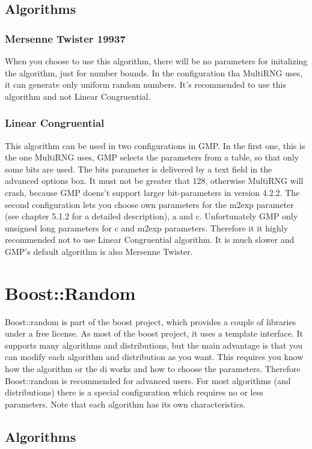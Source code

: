 \documentclass{scrartcl}
\begin{document}
\subsection{Algorithms}
\subsubsection{Mersenne Twister 19937}
When you choose to use this algorithm, there will be no parameters for initalizing the algorithm, just for number bounds. In the configuration tha MultiRNG uses, it can generate only uniform random numbers. It's recommended to use this algorithm and not Linear Congruential.
\subsubsection{Linear Congruential}
This algorithm can be used in two configurations in GMP. In the first one, this is the one MultiRNG uses, GMP selects the parameters from a table, so that only some bits are used. The bits parameter is delivered by a text field in the advanced options box. It must not be greater that 128, otherwise MultiRNG will crash, because GMP doens't support larger bit-parameters in version 4.2.2.\newline
The second configuration lets you choose own parameters for the m2exp parameter (see chapter 5.1.2 for a detailed description), a and c. Unfortunately GMP only unsigned long parameters for c and m2exp parameters. Therefore it it highly recommended not to use Linear Congruential algorithm. It is much slower and GMP's default algorithm is also Mersenne Twister.
\section{Boost::Random}
Boost::random is part of the boost project, which provides a couple of libraries under a free license. As most of the boost project, it uses a template interface. It supports many algorithms and distributions, but the main advantage is that you can modify each algorithm and distribution as you want. This requires you know how the algorithm or the di works and how to choose the parameters. Therefore Boost::random is recommended for advanced users. For most algorithms (and distributions) there is a special configuration which requires no or less parameters. Note that each algorithm has its own characteristics.
\subsection{Algorithms}
\end{document}
